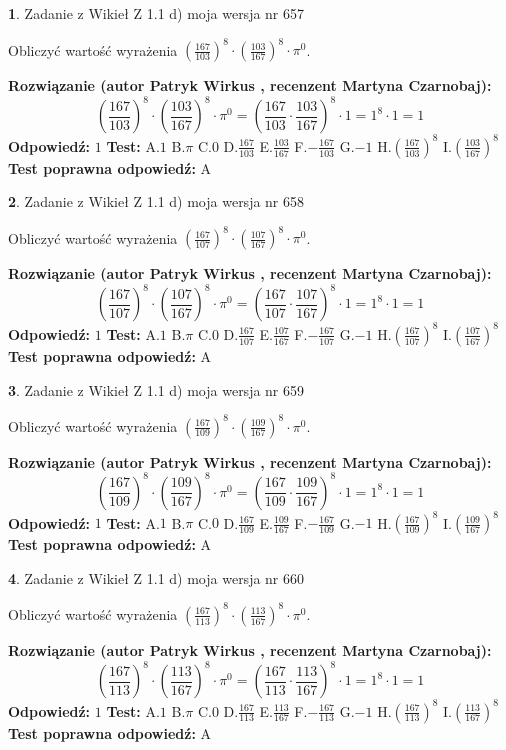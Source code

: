 \documentclass[12pt, a4paper]{article}
\theoremstyle{definition} %
\newtheorem{zad}{}
\newcommand{\zadStart}[1]{\begin{zad}#1\newline}
\newcommand{\zadStop}{\end{zad}}
\newcommand{\rozwStart}[2]{\noindent \textbf{Rozwiązanie (autor #1 , recenzent #2): }\newline}
\newcommand{\rozwStop}{\newline}
\newcommand{\odpStart}{\noindent \textbf{Odpowiedź:}\newline}
\newcommand{\odpStop}{\newline}
\newcommand{\testStart}{\noindent \textbf{Test:}\newline}
\newcommand{\testStop}{\newline}
\newcommand{\kluczStart}{\noindent \textbf{Test poprawna odpowiedź:}\newline}
\newcommand{\kluczStop}{\newline}
\begin{document}
\zadStart{Zadanie z Wikieł Z 1.1 d) moja wersja nr 657}

Obliczyć wartość wyrażenia $(\frac{167}{103})^{8} \cdot (\frac{103}{167})^{8} \cdot \pi^{0}$.
\zadStop
\rozwStart{Patryk Wirkus}{Martyna Czarnobaj}
$$(\frac{167}{103})^{8} \cdot (\frac{103}{167})^{8} \cdot \pi^{0} = (\frac{167}{103} \cdot \frac{103}{167})^{8} \cdot 1 = 1^{8} \cdot 1 = 1$$
\rozwStop
\odpStart
$1$
\odpStop
\testStart
A.$1$ B.$\pi$ C.$0$ D.$\frac{167}{103}$ E.$\frac{103}{167}$
F.$-\frac{167}{103}$ G.$-1$
H.$(\frac{167}{103})^{8}$
I.$(\frac{103}{167})^{8}$
\testStop
\kluczStart
A
\kluczStop



\zadStart{Zadanie z Wikieł Z 1.1 d) moja wersja nr 658}

Obliczyć wartość wyrażenia $(\frac{167}{107})^{8} \cdot (\frac{107}{167})^{8} \cdot \pi^{0}$.
\zadStop
\rozwStart{Patryk Wirkus}{Martyna Czarnobaj}
$$(\frac{167}{107})^{8} \cdot (\frac{107}{167})^{8} \cdot \pi^{0} = (\frac{167}{107} \cdot \frac{107}{167})^{8} \cdot 1 = 1^{8} \cdot 1 = 1$$
\rozwStop
\odpStart
$1$
\odpStop
\testStart
A.$1$ B.$\pi$ C.$0$ D.$\frac{167}{107}$ E.$\frac{107}{167}$
F.$-\frac{167}{107}$ G.$-1$
H.$(\frac{167}{107})^{8}$
I.$(\frac{107}{167})^{8}$
\testStop
\kluczStart
A
\kluczStop



\zadStart{Zadanie z Wikieł Z 1.1 d) moja wersja nr 659}

Obliczyć wartość wyrażenia $(\frac{167}{109})^{8} \cdot (\frac{109}{167})^{8} \cdot \pi^{0}$.
\zadStop
\rozwStart{Patryk Wirkus}{Martyna Czarnobaj}
$$(\frac{167}{109})^{8} \cdot (\frac{109}{167})^{8} \cdot \pi^{0} = (\frac{167}{109} \cdot \frac{109}{167})^{8} \cdot 1 = 1^{8} \cdot 1 = 1$$
\rozwStop
\odpStart
$1$
\odpStop
\testStart
A.$1$ B.$\pi$ C.$0$ D.$\frac{167}{109}$ E.$\frac{109}{167}$
F.$-\frac{167}{109}$ G.$-1$
H.$(\frac{167}{109})^{8}$
I.$(\frac{109}{167})^{8}$
\testStop
\kluczStart
A
\kluczStop



\zadStart{Zadanie z Wikieł Z 1.1 d) moja wersja nr 660}

Obliczyć wartość wyrażenia $(\frac{167}{113})^{8} \cdot (\frac{113}{167})^{8} \cdot \pi^{0}$.
\zadStop
\rozwStart{Patryk Wirkus}{Martyna Czarnobaj}
$$(\frac{167}{113})^{8} \cdot (\frac{113}{167})^{8} \cdot \pi^{0} = (\frac{167}{113} \cdot \frac{113}{167})^{8} \cdot 1 = 1^{8} \cdot 1 = 1$$
\rozwStop
\odpStart
$1$
\odpStop
\testStart
A.$1$ B.$\pi$ C.$0$ D.$\frac{167}{113}$ E.$\frac{113}{167}$
F.$-\frac{167}{113}$ G.$-1$
H.$(\frac{167}{113})^{8}$
I.$(\frac{113}{167})^{8}$
\testStop
\kluczStart
A
\kluczStop
\end{document}
